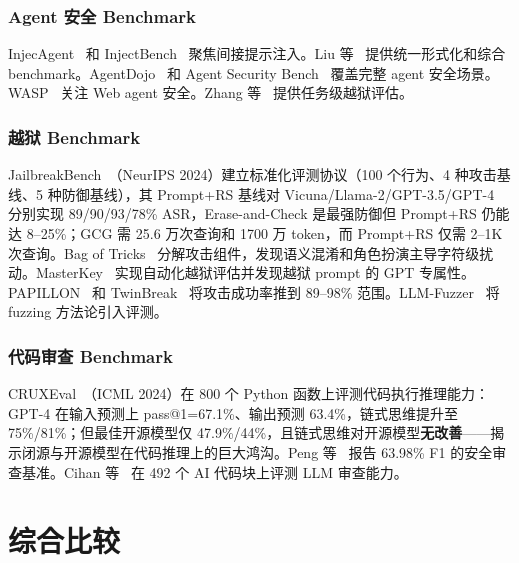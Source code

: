\documentclass[11pt,a4paper,onecolumn]{article}
\begin{document}
\subsubsection{Agent 安全 Benchmark}
InjecAgent~\cite{zhan2024injecagent} 和 InjectBench~\cite{kong2024injectbench} 聚焦间接提示注入。Liu 等~\cite{liu2024promptinjbench} 提供统一形式化和综合 benchmark。AgentDojo~\cite{debenedetti2024agentdojo} 和 Agent Security Bench~\cite{zhang2024asb} 覆盖完整 agent 安全场景。WASP~\cite{evtimov2025wasp} 关注 Web agent 安全。Zhang 等~\cite{zhang2025tasklevel} 提供任务级越狱评估。

\subsubsection{越狱 Benchmark}
JailbreakBench~\cite{chao2024jailbreakbench}（NeurIPS 2024）建立标准化评测协议（100 个行为、4 种攻击基线、5 种防御基线），其 Prompt+RS 基线对 Vicuna/Llama-2/GPT-3.5/GPT-4 分别实现 89/90/93/78\% ASR，Erase-and-Check 是最强防御但 Prompt+RS 仍能达 8--25\%；GCG 需 25.6 万次查询和 1700 万 token，而 Prompt+RS 仅需 2--1K 次查询。Bag of Tricks~\cite{xu2024bagoftricks} 分解攻击组件，发现语义混淆和角色扮演主导字符级扰动。MasterKey~\cite{deng2024masterkey} 实现自动化越狱评估并发现越狱 prompt 的 GPT 专属性。PAPILLON~\cite{gong2025papillon} 和 TwinBreak~\cite{krauss2025twinbreak} 将攻击成功率推到 89--98\% 范围。LLM-Fuzzer~\cite{yu2024fuzzer} 将 fuzzing 方法论引入评测。

\subsubsection{代码审查 Benchmark}
CRUXEval~\cite{cruxeval_2024}（ICML 2024）在 800 个 Python 函数上评测代码执行推理能力：GPT-4 在输入预测上 pass@1=67.1\%、输出预测 63.4\%，链式思维提升至 75\%/81\%；但最佳开源模型仅 47.9\%/44\%，且链式思维对开源模型\textbf{无改善}——揭示闭源与开源模型在代码推理上的巨大鸿沟。Peng 等~\cite{peng_2025_icodereviewer} 报告 63.98\% F1 的安全审查基准。Cihan 等~\cite{cihan_2025_llm_review_eval} 在 492 个 AI 代码块上评测 LLM 审查能力。

\section{综合比较}
\end{document}

